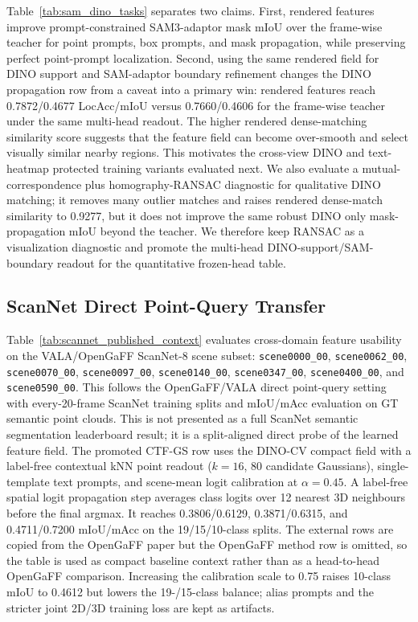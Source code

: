 \documentclass[10pt,twocolumn,letterpaper]{article}
\newcommand{\method}{CTF-GS}
\begin{document}
Table~\ref{tab:sam_dino_tasks} separates two claims. First, rendered features
improve prompt-constrained SAM3-adaptor mask mIoU over the frame-wise teacher
for point prompts, box prompts, and mask propagation, while preserving perfect
point-prompt localization. Second, using the same rendered field for DINO
support and SAM-adaptor boundary refinement changes the DINO propagation row
from a caveat into a primary win: rendered features reach 0.7872/0.4677
LocAcc/mIoU versus 0.7660/0.4606 for the frame-wise teacher under the same
multi-head readout. The higher rendered
dense-matching similarity score suggests that the feature field can become
over-smooth and select visually similar nearby regions. This motivates the
cross-view DINO and text-heatmap protected training variants evaluated next.
We also evaluate a mutual-correspondence plus homography-RANSAC diagnostic for
qualitative DINO matching; it removes many outlier matches and raises rendered
dense-match similarity to 0.9277, but it does not improve the same robust DINO
only mask-propagation mIoU beyond the teacher. We therefore keep RANSAC as a
visualization diagnostic and promote the multi-head DINO-support/SAM-boundary
readout for the quantitative frozen-head table.

\subsection{ScanNet Direct Point-Query Transfer}



Table~\ref{tab:scannet_published_context} evaluates cross-domain feature
usability on the VALA/OpenGaFF ScanNet-8 scene subset:
\texttt{scene0000\_00}, \texttt{scene0062\_00}, \texttt{scene0070\_00},
\texttt{scene0097\_00}, \texttt{scene0140\_00}, \texttt{scene0347\_00},
\texttt{scene0400\_00}, and \texttt{scene0590\_00}. This follows the
OpenGaFF/VALA direct point-query setting with every-20-frame ScanNet training
splits and mIoU/mAcc evaluation on GT semantic point clouds. This is not
presented as a full ScanNet semantic segmentation leaderboard result; it is a
split-aligned direct probe of the learned feature field. The promoted
\method{} row uses the DINO-CV compact field with a label-free contextual kNN
point readout ($k=16$, 80 candidate Gaussians), single-template text prompts, and
scene-mean logit calibration at $\alpha=0.45$. A label-free spatial logit
propagation step averages class logits over 12 nearest 3D neighbours before the
final argmax. It reaches 0.3806/0.6129,
0.3871/0.6315, and 0.4711/0.7200 mIoU/mAcc on the 19/15/10-class splits. The
external rows are copied from the OpenGaFF paper but the OpenGaFF method row is
omitted, so the table is used as compact baseline context rather than as a
head-to-head OpenGaFF comparison. Increasing the calibration scale to 0.75
raises 10-class mIoU to 0.4612 but lowers the 19-/15-class balance; alias
prompts and the stricter joint 2D/3D training loss are kept as artifacts.
\end{document}
